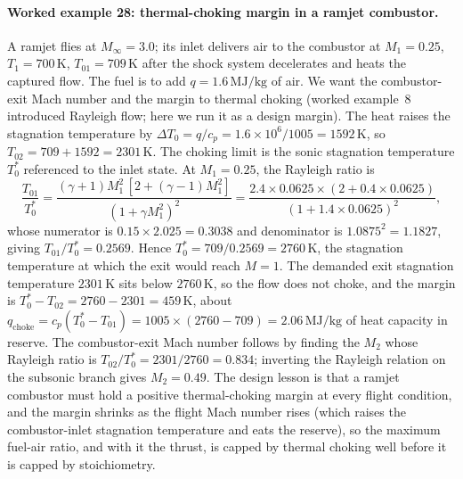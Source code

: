 \paragraph{Worked example 28: thermal-choking margin in a ramjet
combustor.} A ramjet flies at $M_\infty = 3.0$; its inlet delivers air
to the combustor at $M_1 = 0.25$, $T_1 = 700\,\si{\kelvin}$,
$T_{01} = 709\,\si{\kelvin}$ after the shock system decelerates and
heats the captured flow. The fuel is to add $q = 1.6\,\si{\mega\joule
\per\kilogram}$ of air. We want the combustor-exit Mach number and the
margin to thermal choking (worked example~8 introduced Rayleigh flow;
here we run it as a design margin). The heat raises the stagnation
temperature by $\Delta T_0 = q/c_p = 1.6\times 10^{6}/1005 =
1592\,\si{\kelvin}$, so $T_{02} = 709 + 1592 = 2301\,\si{\kelvin}$. The
choking limit is the sonic stagnation temperature $T_0^*$ referenced to
the inlet state. At $M_1 = 0.25$, the Rayleigh ratio is
\[
\frac{T_{01}}{T_0^*} = \frac{(\gamma + 1)M_1^2\,[2 + (\gamma - 1)M_1^2]}
{(1 + \gamma M_1^2)^2}
= \frac{2.4\times 0.0625\times(2 + 0.4\times 0.0625)}{(1 + 1.4\times
0.0625)^2},
\]
whose numerator is $0.15\times 2.025 = 0.3038$ and denominator is
$1.0875^2 = 1.1827$, giving $T_{01}/T_0^* = 0.2569$. Hence
$T_0^* = 709/0.2569 = 2760\,\si{\kelvin}$, the stagnation temperature at
which the exit would reach $M = 1$. The demanded exit stagnation
temperature $2301\,\si{\kelvin}$ sits below $2760\,\si{\kelvin}$, so the
flow does not choke, and the margin is
$T_0^* - T_{02} = 2760 - 2301 = 459\,\si{\kelvin}$, about
$q_{\text{choke}} = c_p(T_0^* - T_{01}) = 1005\times(2760 - 709) =
2.06\,\si{\mega\joule\per\kilogram}$ of heat capacity in reserve. The
combustor-exit Mach number follows by finding the $M_2$ whose Rayleigh
ratio is $T_{02}/T_0^* = 2301/2760 = 0.834$; inverting the Rayleigh
relation on the subsonic branch gives $M_2 = 0.49$. The design lesson is
that a ramjet combustor must hold a positive thermal-choking margin at
every flight condition, and the margin shrinks as the flight Mach number
rises (which raises the combustor-inlet stagnation temperature and eats
the reserve), so the maximum fuel-air ratio, and with it the thrust, is
capped by thermal choking well before it is capped by stoichiometry.


